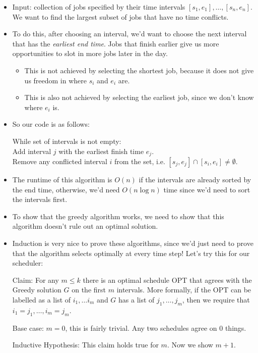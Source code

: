 \documentclass[10pt]{article}
\begin{document}
	\begin{itemize}
		\item Input: collection of jobs specified by their time intervals $[s_1, e_1], \dots, [s_n, e_n]$. We
			want to find the largest subset of jobs that have no time conflicts.
		\item To do this, after choosing an interval, we'd want to choose the next interval that 
			has the \textit{earliest end time}. Jobs that finish earlier give us more opportunities to 
			slot in more jobs later in the day. 
			\begin{itemize}
				\item This is not achieved by selecting the shortest job, because it does not give us freedom 
					in where $s_i$ and $e_i$ are. 
				\item This is also not achieved by selecting the earliest job, since we don't know where $e_i$
					is. 
			\end{itemize}
		\item So our code is as follows:

			While set of intervals is not empty: \\
			Add interval $j$ with the earliest finish time $e_j$. \\
			Remove any conflicted interval $i$ from the set, i.e. $[s_j, e_j] \cap [s_i, e_i] \neq 
				\emptyset$.
		\item The runtime of this algorithm is $O(n)$ if the intervals are already sorted by the end time,
				otherwise, we'd need $O(n \log n)$ time since we'd need to sort the intervals first.
		\item To show that the greedy algorithm works, we need to show that this algorithm doesn't rule out 
			an optimal solution.
		\item Induction is very nice to prove these algorithms, since we'd just need to prove that 
			the algorithm selects optimally at every time step! Let's try this for our scheduler: 

			Claim: For any $m \le k$ there is an optimal schedule OPT that agrees with the Greedy solution 
			$G$ on the first $m$ intervals. More formally, if the OPT can be labelled as a list of $i_1, \dots
			i_m$ and $G$ has a list of $j_1, \dots, j_m$, then we require that $i_1 = j_1, \dots, i_m = j_m$.

			Base case: $m = 0$, this is fairly trivial. Any two schedules agree on 0 things.

			Inductive Hypothesis: This claim holds true for $m$. Now we show $m+1$. 


\end{itemize}
\end{document}
